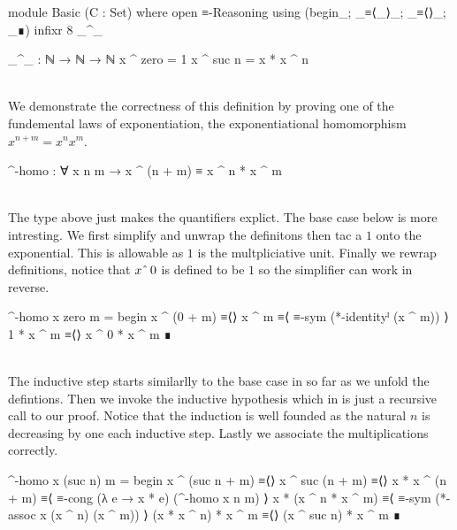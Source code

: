 \documentclass[./Thesis.tex]{subfiles}
\begin{document}
\begin{code}[hide]
  module Basic (C : Set) where
    open ≡-Reasoning using (begin_; _≡⟨_⟩_; _≡⟨⟩_; _∎)
    infixr 8 _^_
\end{code}
\begin{code}[inline]
    _^_ : ℕ → ℕ → ℕ
    x ^ zero = 1
    x ^ suc n = x * x ^ n
\end{code} \\

We demonstrate the correctness of this definition by proving one of the
fundemental laws of exponentiation,
the exponentiational homomorphism $x^{n + m} = x^n x^m$. \\
\begin{code}
    ^-homo : ∀ x n m → x ^ (n + m) ≡ x ^ n * x ^ m
\end{code} \\
The type above just makes the quantifiers explict. The base case below
is more intresting. We first simplify and unwrap the definitons then
tac a $1$ onto the exponential. This is allowable as $1$ is the
multpliciative unit. Finally we rewrap definitions, notice that
$x \string^{} \, 0$ is defined to be $1$ so the simplifier can work in reverse.
\begin{code}
    ^-homo x zero m = begin
      x ^ (0 + m)   ≡⟨⟩
      x ^ m         ≡⟨ ≡-sym (*-identityˡ (x ^ m)) ⟩
      1 * x ^ m     ≡⟨⟩
      x ^ 0 * x ^ m ∎
\end{code} \\
The inductive step starts similarlly to the base case in so far as we
unfold the defintions. Then we invoke the inductive hypothesis which in \Agda{}
is just a recursive call to our proof. Notice that the induction is well founded
as the natural $n$ is decreasing by one each inductive step.
Lastly we associate the multiplications correctly.
\begin{code}
    ^-homo x (suc n) m = begin
      x ^ (suc n + m)     ≡⟨⟩
      x ^ suc (n + m)     ≡⟨⟩
      x * x ^ (n + m)     ≡⟨ ≡-cong (λ e → x * e) (^-homo x n m) ⟩
      x * (x ^ n * x ^ m) ≡⟨ ≡-sym (*-assoc x (x ^ n) (x ^ m)) ⟩
      (x * x ^ n) * x ^ m ≡⟨⟩
      (x ^ suc n) * x ^ m ∎
\end{code} \\
\end{document}
